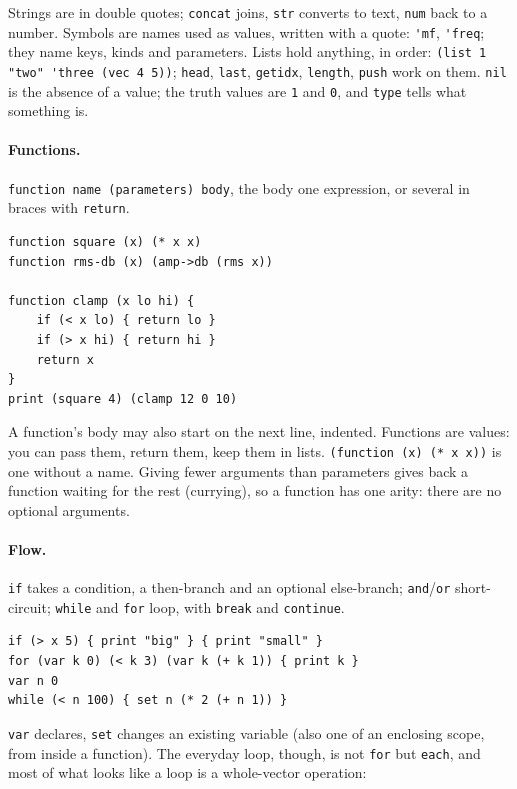 \documentclass[11pt,a4paper]{article}
\newcommand{\musil}[1]{\lstinline[style=musilinline]{#1}}
\begin{document}
Strings are in double quotes; \musil{concat} joins, \musil{str} converts to text,
\musil{num} back to a number. Symbols are names used as values, written with a quote:
\musil{'mf}, \musil{'freq}; they name keys, kinds and parameters. Lists hold anything, in
order: \musil{(list 1 "two" 'three (vec 4 5))}; \musil{head}, \musil{last}, \musil{getidx},
\musil{length}, \musil{push} work on them. \musil{nil} is the absence of a value; the
truth values are \musil{1} and \musil{0}, and \musil{type} tells what something is.

\paragraph{Functions.} \musil{function name (parameters) body}, the body one expression, or
several in braces with \musil{return}.

\begin{lstlisting}
function square (x) (* x x)
function rms-db (x) (amp->db (rms x))

function clamp (x lo hi) {
    if (< x lo) { return lo }
    if (> x hi) { return hi }
    return x
}
print (square 4) (clamp 12 0 10)
\end{lstlisting}

A function's body may also start on the next line, indented. Functions are values: you can
pass them, return them, keep them in lists. \musil{(function (x) (* x x))} is one without a
name. Giving fewer arguments than parameters gives back a function waiting for the rest
(currying), so a function has one arity: there are no optional arguments.

\paragraph{Flow.} \musil{if} takes a condition, a then-branch and an optional else-branch;
\musil{and}/\musil{or} short-circuit; \musil{while} and \musil{for} loop, with
\musil{break} and \musil{continue}.

\begin{lstlisting}
if (> x 5) { print "big" } { print "small" }
for (var k 0) (< k 3) (var k (+ k 1)) { print k }
var n 0
while (< n 100) { set n (* 2 (+ n 1)) }
\end{lstlisting}

\musil{var} declares, \musil{set} changes an existing variable (also one of an enclosing
scope, from inside a function). The everyday loop, though, is not \musil{for} but
\musil{each}, and most of what looks like a loop is a whole-vector operation:
\end{document}
